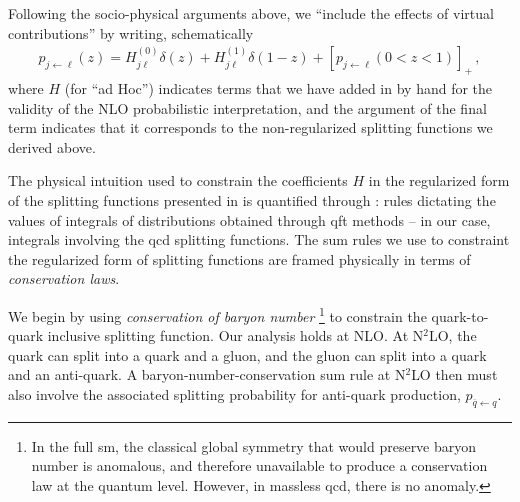 Following the socio-physical arguments above, we ``include the effects of virtual contributions'' by writing, schematically
\begin{align}
    \label{eq:start-regularizing}
    p_{j\leftarrow \ell}(z)
    =
    H^{(0)}_{j\ell} \delta(z)
    +
    H^{(1)}_{j\ell} \delta(1-z)
    +
    [p_{j\leftarrow \ell}(0<z<1)]_+
    \,,
\end{align}
where \(H\) (for ``ad Hoc'') indicates terms that we have added in by hand for the validity of the NLO probabilistic interpretation, and the argument of the final term indicates that it corresponds to the non-regularized splitting functions we derived above.


The physical intuition used to constrain the coefficients \(H\) in the regularized form of the splitting functions presented in  is quantified through :
%
rules dictating the values of integrals of distributions obtained through \gls{qft} methods -- in our case, integrals involving the \gls{qcd} splitting functions.
%
The sum rules we use to constraint the regularized form of splitting functions are framed physically in terms of \textit{conservation laws}.


We begin by using \emph{conservation of baryon number}%
\footnote{
    In the full \gls{sm}, the classical global symmetry that would preserve baryon number is anomalous, and therefore unavailable to produce a conservation law at the quantum level.
    However, in massless \gls{qcd}, there is no anomaly.
}
%
to constrain the quark-to-quark inclusive splitting function.
%
Our analysis holds at NLO.
%
At N\(^2\)LO, the quark can split into a quark and a gluon, and the gluon can split into a quark and an anti-quark.
%
A baryon-number-conservation sum rule at N\(^2\)LO then must also involve the associated splitting probability for anti-quark production, \(p_{\overline{q} \leftarrow q}\).

